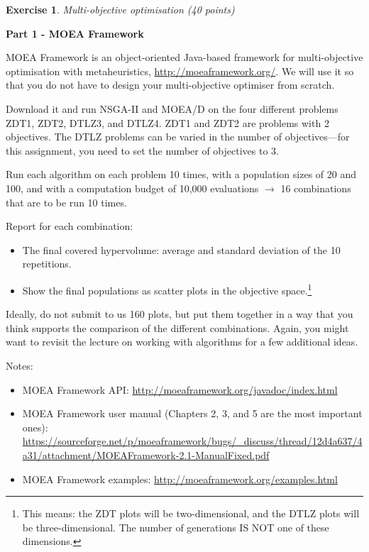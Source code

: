 \documentclass{pracs}
\newtheorem{exercise}{Exercise}
\begin{document}
\begin{exercise}
Multi-objective optimisation (40 points)
\end{exercise}

\noindent\textbf{Part 1 - MOEA Framework}

MOEA Framework is an object-oriented Java-based framework for multi-objective optimisation with metaheuristics, \url{http://moeaframework.org/}. We will use it so that you do not have to design your multi-objective optimiser from scratch.

Download it and run NSGA-II and MOEA/D on the four different problems ZDT1, ZDT2, DTLZ3, and DTLZ4. ZDT1 and ZDT2 are problems with 2 objectives. The DTLZ problems can be varied in the number of objectives---for this assignment, you need to set the number of objectives to 3.

Run each algorithm on each problem 10 times, with a population sizes of 20 and 100, and with a computation budget of 10,000 evaluations $\rightarrow$ 16 combinations that are to be run 10 times.

Report for each combination:
\begin{itemize}
\item The final covered hypervolume: average and standard deviation of the 10 repetitions.
\item Show the final populations as scatter plots in the objective space.\footnote{This means: the ZDT plots will be two-dimensional, and the DTLZ plots will be three-dimensional. The number of generations IS NOT one of these dimensions.}
\end{itemize}

Ideally, do not submit to us 160 plots, but put them together in a way that you think supports the comparison of the different combinations. Again, you might want to revisit the lecture on working with algorithms for a few additional ideas.

Notes:
\begin{itemize}
\item MOEA Framework API: \url{http://moeaframework.org/javadoc/index.html}
\item MOEA Framework user manual (Chapters 2, 3, and 5 are the most important ones): \url{https://sourceforge.net/p/moeaframework/bugs/_discuss/thread/12d4a637/4a31/attachment/MOEAFramework-2.1-ManualFixed.pdf}
\item MOEA Framework examples: \url{http://moeaframework.org/examples.html}
\end{itemize}
\end{document}
